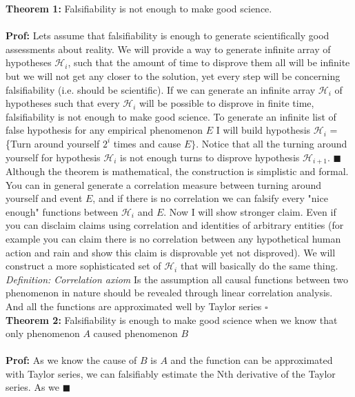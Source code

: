 \documentclass{article}
\begin{document}
	\textbf{Theorem 1:}  Falsifiability is not enough to make good science. \\\\
	\textbf{Prof:} Lets assume that falsifiability is enough to generate scientifically good assessments about reality. We will provide a way to generate infinite array of hypotheses $\mathcal{H}_{i}$, such that the amount of time to disprove them all will be infinite but we will not get any closer to the solution, yet every step will be concerning falsifiability (i.e. should be scientific). If we can generate an infinite array $\mathcal{H}_{i}$ of hypotheses such that every $\mathcal{H}_{i}$ will be possible to disprove in finite time, falsifiability is not enough to make good science. To generate an infinite list of false hypothesis for any empirical phenomenon $E$ I will build hypothesis $\mathcal{H}_{i}$ = \{Turn around yourself $2^{i}$ times and cause $E\}$. Notice that all the turning around yourself for hypothesis $\mathcal{H}_{i}$ is not enough turns to disprove hypothesis $\mathcal{H}_{i+1}$. $\blacksquare$\\

Although the theorem is mathematical, the construction is simplistic and formal. You can in general generate a correlation measure between turning around yourself and event $E$, and if there is no correlation we can falsify every "nice enough" functions between $\mathcal{H}_{i}$ and $E$. Now I will show stronger claim. Even if you can disclaim claims using correlation and identities of arbitrary entities (for example you can claim there is no correlation between any hypothetical human action and rain and show this claim is disprovable yet not disproved). We will construct a more sophisticated set of $\mathcal{H}_{i}$ that will basically do the same thing.\\ 

\textit{Definition: Correlation axiom} Is the assumption all causal functions between two phenomenon in nature should be revealed through linear correlation analysis. And all the functions are approximated well by Taylor series $\square$\\

\textbf{Theorem 2:}  Falsifiability is enough to make good science when we know that only phenomenon $A$ caused phenomenon $B$\\\\
\textbf{Prof:} 
As we know the cause of $B$ is $A$ and the function can be approximated with Taylor series, we can falsifiably estimate the Nth derivative of the Taylor series. As we  $\blacksquare$\\
\end{document}
